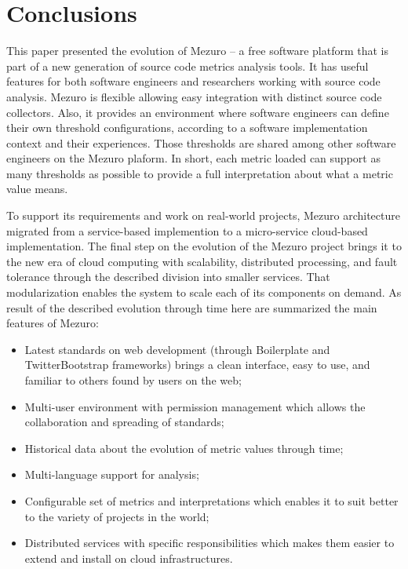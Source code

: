 \section{Conclusions}
\label{sec:conclusions}

This paper presented the evolution of Mezuro -- a free software platform that
is part of a new generation of source code metrics analysis tools.  It has
useful features for both software engineers and researchers working with source
code analysis. Mezuro is flexible allowing easy integration with distinct
source code collectors. Also, it provides an environment where software
engineers can define their own threshold configurations, according to a software
implementation context and their experiences. Those thresholds are shared among
other software engineers on the Mezuro plaform.  In short, each metric loaded
can support as many thresholds as possible to provide a full interpretation
about what a metric value means.

To support its requirements and work on real-world projects, Mezuro architecture
migrated from a service-based implemention to a micro-service cloud-based
implementation. The final step on the evolution of the Mezuro project brings
it to the new era of cloud computing with scalability, distributed processing,
and fault tolerance through the described division into smaller services. That
modularization enables the system to scale each of its components on demand.
As result of the described evolution through time here are summarized the main
features of Mezuro:

\begin{itemize}

  \item Latest standards on web development (through Boilerplate and
        TwitterBootstrap frameworks) brings a clean interface, easy to use, and familiar
        to others found by users on the web;

  \item Multi-user environment with permission management which allows the
        collaboration and spreading of standards;

  \item Historical data about the evolution of metric values through time;

  \item Multi-language support for analysis;

  \item Configurable set of metrics and interpretations which enables it to
        suit better to the variety of projects in the world;

  \item Distributed services with specific responsibilities which makes them
        easier to extend and install on cloud infrastructures.

\end{itemize}

